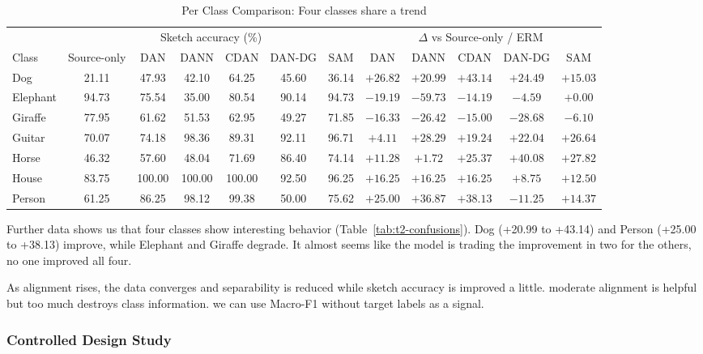 \documentclass{article}
\begin{document}
\begin{table}[tb]
  \caption{Per Class Comparison: Four classes share a trend}
  \label{tab:t2-per-class}
  \centering
  \footnotesize
  \setlength{\tabcolsep}{3pt}
  \begin{tabular}{lccccccccccc}
    \toprule
    & \multicolumn{6}{c}{Sketch accuracy (\%)} & \multicolumn{5}{c}{$\Delta$ vs Source-only / ERM} \\
    \cmidrule(lr){2-7} \cmidrule(lr){8-12}
    Class & Source-only & DAN & DANN & CDAN & DAN-DG & SAM & DAN & DANN & CDAN & DAN-DG & SAM \\
    \midrule
    Dog      & 21.11 & 47.93 & 42.10 & 64.25 & 45.60 & 36.14 & $+26.82$ & $+20.99$ & $+43.14$ & $+24.49$ & $+15.03$ \\
    Elephant & 94.73 & 75.54 & 35.00 & 80.54 & 90.14 & 94.73 & $-19.19$ & $-59.73$ & $-14.19$ & $-4.59$ & $+0.00$ \\
    Giraffe  & 77.95 & 61.62 & 51.53 & 62.95 & 49.27 & 71.85 & $-16.33$ & $-26.42$ & $-15.00$ & $-28.68$ & $-6.10$ \\
    Guitar   & 70.07 & 74.18 & 98.36 & 89.31 & 92.11 & 96.71 & $+4.11$ & $+28.29$ & $+19.24$ & $+22.04$ & $+26.64$ \\
    Horse    & 46.32 & 57.60 & 48.04 & 71.69 & 86.40 & 74.14 & $+11.28$ & $+1.72$ & $+25.37$ & $+40.08$ & $+27.82$ \\
    House    & 83.75 & 100.00 & 100.00 & 100.00 & 92.50 & 96.25 & $+16.25$ & $+16.25$ & $+16.25$ & $+8.75$ & $+12.50$ \\
    Person   & 61.25 & 86.25 & 98.12 & 99.38 & 50.00 & 75.62 & $+25.00$ & $+36.87$ & $+38.13$ & $-11.25$ & $+14.37$ \\
    \bottomrule
  \end{tabular}
\end{table}

Further data shows us that four classes show interesting behavior (Table~\ref{tab:t2-confusions}). Dog (+20.99 to +43.14) and Person (+25.00 to +38.13) improve, while
Elephant and Giraffe degrade. It almost seems like the model is trading the improvement in two for the others, no one improved all four.

As alignment rises, the data converges and separability is reduced while sketch accuracy is improved a little. moderate alignment is helpful but too much destroys class information.
we can use Macro-F1 without target labels as a signal.
\subsubsection{Controlled Design Study}
\end{document}
